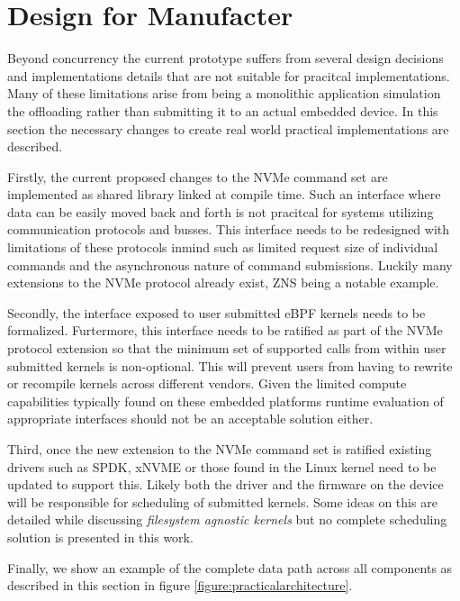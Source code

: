 \section{Design for Manufacter}

Beyond concurrency the current prototype suffers from several design decisions
and implementations details that are not suitable for pracitcal implementations.
Many of these limitations arise from being a monolithic application simulation
the offloading rather than submitting it to an actual embedded device. In this
section the necessary changes to create real world practical implementations are
described.

Firstly, the current proposed changes to the NVMe command set are implemented as
shared library linked at compile time. Such an interface where data can be
easily moved back and forth is not pracitcal for systems utilizing communication
protocols and busses. This interface needs to be redesigned with limitations of
these protocols inmind such as limited request size of individual commands and
the asynchronous nature of command submissions. Luckily many extensions to
the NVMe protocol already exist, ZNS being a notable example.

Secondly, the interface exposed to user submitted eBPF kernels needs to be
formalized. Furtermore, this interface needs to be ratified as part of the NVMe
protocol extension so that the minimum set of supported calls from within 
user submitted kernels is non-optional. This will prevent users from having to
rewrite or recompile kernels across different vendors. Given the limited compute
capabilities typically found on these embedded platforms runtime evaluation of
appropriate interfaces should not be an acceptable solution either.

Third, once the new extension to the NVMe command set is ratified existing
drivers such as SPDK, xNVME or those found in the Linux kernel need to be
updated to support this. Likely both the driver and the firmware on the device
will be responsible for scheduling of submitted kernels. Some ideas on this are
detailed while discussing \textit{filesystem agnostic kernels} but no complete
scheduling solution is presented in this work.

Finally, we show an example of the complete data path across all components as
described in this section in figure \ref{figure:practicalarchitecture}.

